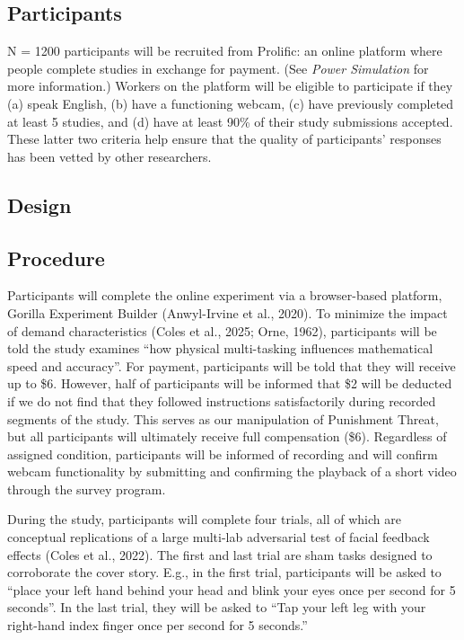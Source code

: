 \documentclass[
  letterpaper,
  DIV=11,
  numbers=noendperiod]{scrartcl}
\begin{document}
\subsection{Participants}\label{participants}

N = 1200 participants will be recruited from Prolific: an online
platform where people complete studies in exchange for payment. (See
\emph{Power Simulation} for more information.) Workers on the platform
will be eligible to participate if they (a) speak English, (b) have a
functioning webcam, (c) have previously completed at least 5 studies,
and (d) have at least 90\% of their study submissions accepted. These
latter two criteria help ensure that the quality of participants'
responses has been vetted by other researchers.

\subsection{Design}\label{design}

\subsection{Procedure}\label{procedure}

Participants will complete the online experiment via a browser-based
platform, Gorilla Experiment Builder (Anwyl-Irvine et al., 2020). To
minimize the impact of demand characteristics (Coles et al., 2025; Orne,
1962), participants will be told the study examines ``how physical
multi-tasking influences mathematical speed and accuracy''. For payment,
participants will be told that they will receive up to \$6. However,
half of participants will be informed that \$2 will be deducted if we do
not find that they followed instructions satisfactorily during recorded
segments of the study. This serves as our manipulation of Punishment
Threat, but all participants will ultimately receive full compensation
(\$6). Regardless of assigned condition, participants will be informed
of recording and will confirm webcam functionality by submitting and
confirming the playback of a short video through the survey program.

During the study, participants will complete four trials, all of which
are conceptual replications of a large multi-lab adversarial test of
facial feedback effects ({Coles et al.}, 2022). The first and last trial
are sham tasks designed to corroborate the cover story. E.g., in the
first trial, participants will be asked to ``place your left hand behind
your head and blink your eyes once per second for 5 seconds''. In the
last trial, they will be asked to ``Tap your left leg with your
right-hand index finger once per second for 5 seconds.''
\end{document}
